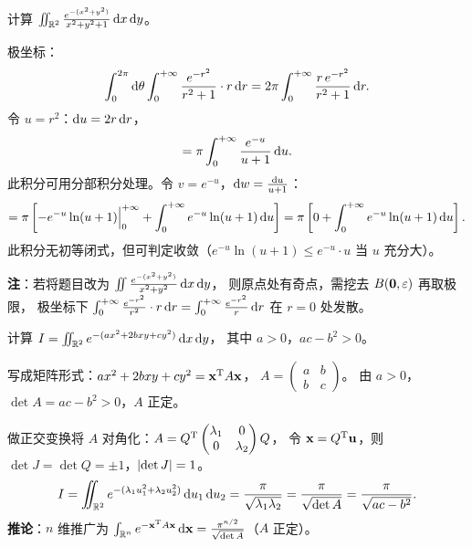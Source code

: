 \documentclass{ctexart}
\begin{document}
\begin{exercise}
  计算 $\iint_{\mathbb{R}^2} \frac{e^{-(x^2+y^2)}}{x^2+y^2+1}\,\mathrm{d} x\,\mathrm{d} y$。
\end{exercise}

\begin{solution}
  极坐标：
  \[
    \int_0^{2\pi}\mathrm{d}\theta\int_0^{+\infty}\frac{e^{-r^2}}{r^2+1}\cdot r\,\mathrm{d} r
    = 2\pi\int_0^{+\infty}\frac{r\,e^{-r^2}}{r^2+1}\,\mathrm{d} r.
  \]
  令 $u = r^2$：$\mathrm{d} u = 2r\,\mathrm{d} r$，
  \[
    = \pi\int_0^{+\infty}\frac{e^{-u}}{u+1}\,\mathrm{d} u.
  \]
  此积分可用分部积分处理。令 $v = e^{-u}$，$\mathrm{d} w = \frac{\mathrm{d} u}{u+1}$：
  \[
    = \pi\left[-e^{-u}\ln(u+1)\Big|_0^{+\infty} + \int_0^{+\infty} e^{-u}\ln(u+1)\,\mathrm{d} u\right]
    = \pi\left[0 + \int_0^{+\infty} e^{-u}\ln(u+1)\,\mathrm{d} u\right].
  \]
  此积分无初等闭式，但可判定收敛（$e^{-u}\ln(u+1) \le e^{-u}\cdot u$ 当 $u$ 充分大）。

  \textbf{注}：若将题目改为 $\iint\frac{e^{-(x^2+y^2)}}{x^2+y^2}\,\mathrm{d} x\,\mathrm{d} y$，
  则原点处有奇点，需挖去 $B(\mathbf{0},\varepsilon)$ 再取极限，
  极坐标下 $\int_0^{+\infty}\frac{e^{-r^2}}{r^2}\cdot r\,\mathrm{d} r = \int_0^{+\infty}\frac{e^{-r^2}}{r}\,\mathrm{d} r$
  在 $r=0$ 处发散。
\end{solution}

\begin{exercise}[综合——概率论中的积分]
  计算 $I = \iint_{\mathbb{R}^2} e^{-(ax^2+2bxy+cy^2)}\,\mathrm{d} x\,\mathrm{d} y$，
  其中 $a > 0$，$ac - b^2 > 0$。
\end{exercise}

\begin{solution}
  写成矩阵形式：$ax^2+2bxy+cy^2 = \mathbf{x}^{\mathrm{T}} A \mathbf{x}$，
  $A = \begin{pmatrix} a & b \\ b & c \end{pmatrix}$。
  由 $a > 0$，$\det A = ac-b^2 > 0$，$A$ 正定。

  做正交变换将 $A$ 对角化：$A = Q^{\mathrm{T}} \begin{pmatrix} \lambda_1 & 0 \\ 0 & \lambda_2 \end{pmatrix} Q$，
  令 $\mathbf{x} = Q^{\mathrm{T}} \mathbf{u}$，则 $\det J = \det Q = \pm 1$，$\left| \det J \right| = 1$。
  \[
    I = \iint_{\mathbb{R}^2} e^{-(\lambda_1 u_1^2 + \lambda_2 u_2^2)}\,\mathrm{d} u_1\,\mathrm{d} u_2
    = \frac{\pi}{\sqrt{\lambda_1\lambda_2}}
    = \frac{\pi}{\sqrt{\det A}}
    = \frac{\pi}{\sqrt{ac-b^2}}.
  \]
  \textbf{推论}：$n$ 维推广为 $\int_{\mathbb{R}^n} e^{-\mathbf{x}^{\mathrm{T}} A \mathbf{x}}\,\mathrm{d} \mathbf{x}
  = \frac{\pi^{n/2}}{\sqrt{\det A}}$（$A$ 正定）。
\end{solution}
\end{document}
